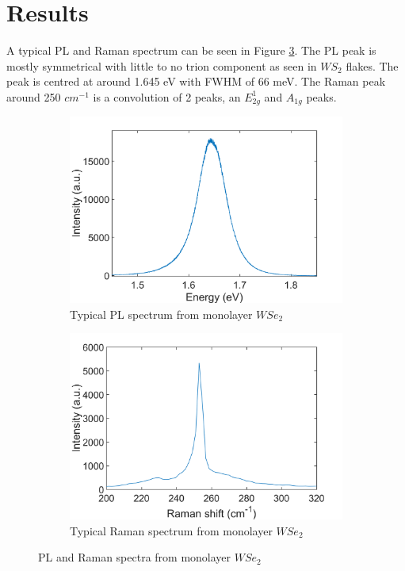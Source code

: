 \section{Results}
	
	A typical PL and Raman spectrum can be seen in Figure \ref{fig:WSe2PLRamanSpectra}. The PL peak is mostly symmetrical with little to no trion component as seen in $WS_2$ flakes. The peak is centred at around 1.645 eV with FWHM of 66 meV. The Raman peak around 250 $cm^{-1}$ is a convolution of 2 peaks, an $E^1_{2g}$ and $A_{1g}$ peaks.  
	
\begin{figure}[!h]
	\begin{center}
		\begin{subfigure}[b]{0.4\textwidth}
			\includegraphics[scale=0.2]{WSe2/PLSpectrum.png}
			\caption{Typical PL spectrum from monolayer $WSe_2$}
			\label{fig:WSe2PLSpectrum}
		\end{subfigure}
		\qquad
		\begin{subfigure}[b]{0.4\textwidth}
			\includegraphics[scale=0.2]{WSe2/RamanSpectrum.png}
			\caption{Typical Raman spectrum from monolayer $WSe_2$}
			\label{fig:WSe2RamanSpectrum}
		\end{subfigure}
		\caption{PL and Raman spectra from monolayer $WSe_2$}
		\label{fig:WSe2PLRamanSpectra}
	\end{center}
\end{figure}
	
